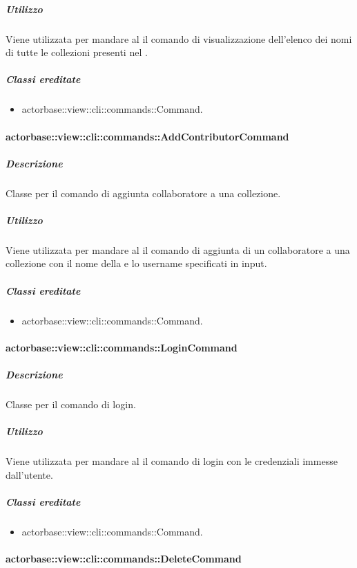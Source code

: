 \documentclass{scalatekids-article}
\begin{document}
\subparagraph{Utilizzo}

Viene utilizzata per mandare al  il comando di
visualizzazione dell'elenco dei nomi di tutte le collezioni presenti nel
.

\subparagraph{Classi ereditate}

\begin{itemize}
\item actorbase::view::cli::commands::Command.
\end{itemize}

\paragraph{actorbase::view::cli::commands::AddContributorCommand}

\subparagraph{Descrizione}

Classe per il comando di aggiunta collaboratore a una collezione.

\subparagraph{Utilizzo}

Viene utilizzata per mandare al  il comando di aggiunta di
un collaboratore a una collezione con il nome della  e lo
username specificati in input.

\subparagraph{Classi ereditate}

\begin{itemize}
\item actorbase::view::cli::commands::Command.
\end{itemize}

\paragraph{actorbase::view::cli::commands::LoginCommand}

\subparagraph{Descrizione}

Classe per il comando di login.

\subparagraph{Utilizzo}

Viene utilizzata per mandare al  il comando di login con le
credenziali immesse dall'utente.

\subparagraph{Classi ereditate}

\begin{itemize}
\item actorbase::view::cli::commands::Command.
\end{itemize}

\paragraph{actorbase::view::cli::commands::DeleteCommand}
\end{document}
